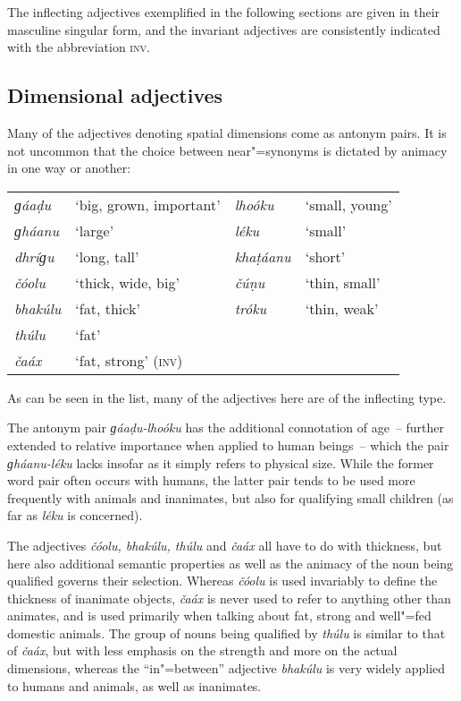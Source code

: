 The inflecting adjectives exemplified in the following sections are given in their masculine singular form, and the invariant adjectives are consistently indicated with the abbreviation \textsc{inv}.


\subsection{Dimensional adjectives}
\label{subsec:6-2-1}

Many of the adjectives denoting spatial dimensions come as antonym pairs. It is not uncommon that the choice between near"=synonyms is dictated by animacy in one way or another:



\begin{table}[H]
\begin{tabularx}{\textwidth}{ l Q l Q }
\textit{ɡáaḍu} &
`big, grown, important' &
\textit{lhoóku} &
`small, young'\\
\textit{ɡháanu} &
`large' &
\textit{léku} &
`small'\\
\textit{dhríɡu} &
`long, tall' &
\textit{khaṭáanu} &
`short'\\
\textit{čóolu} &
`thick, wide, big' &
\textit{čúṇu} &
`thin, small'\\
\textit{bhakúlu} &
`fat, thick' &
\textit{tróku} &
`thin, weak'\\
\textit{thúlu} &
`fat' &
&
\\
\textit{čaáx} &
`fat, strong' (\textsc{inv)} &
&
\\
\end{tabularx}
\end{table}


As can be seen in the list, many of the adjectives here are of the inflecting type.


The antonym pair \textit{ɡáaḍu-lhoóku} has the additional connotation of age~-- further extended to relative importance when applied to human beings~-- which the pair \textit{ɡháanu-léku} lacks insofar as it simply refers to physical size. While the former word pair often occurs with humans, the latter pair tends to be used more frequently with animals and inanimates, but also for qualifying small children (as far as \textit{léku} is concerned).



The adjectives \textit{čóolu, bhakúlu, thúlu} and \textit{čaáx} all have to do with thickness, but here also additional semantic properties as well as the animacy of the noun being qualified governs their selection. Whereas \textit{čóolu} is used invariably to define the thickness of inanimate objects, \textit{čaáx} is never used to refer to anything other than animates, and is used primarily when talking about fat, strong and well"=fed domestic animals. The group of nouns being qualified by \textit{thúlu} is similar to that of \textit{čaáx}, but with less emphasis on the strength and more on the actual dimensions, whereas the ``in"=between'' adjective \textit{bhakúlu} is very widely applied to humans and animals, as well as inanimates. 



